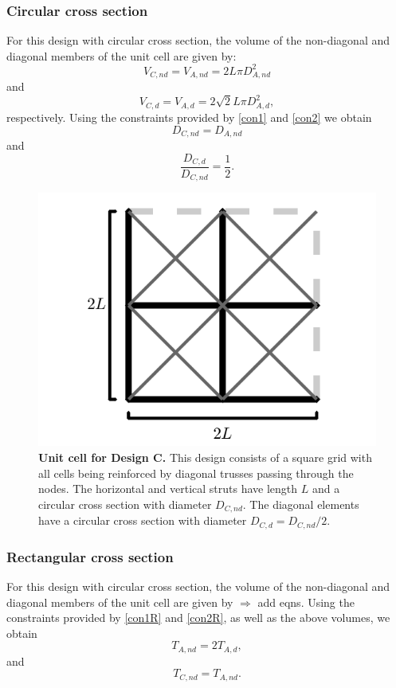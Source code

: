 \documentclass[10pt,twoside]{fernandes_supp}
\newcommand{\KB}[1]{\noindent\color{blue}$\Longrightarrow$ #1\normalcolor}
\begin{document}
\subsubsection{Circular cross section}
For this design with circular cross section, the volume of the non-diagonal and diagonal members  of the unit cell are given by:
\begin{equation}
V_{C,nd}=V_{A,nd}=2 L \pi D^2_{A,nd}
\end{equation}
and
\begin{equation}
V_{C,d}=V_{A,d}=2\sqrt{2}L \pi D^2_{A,d},
\end{equation}
respectively.
Using the constraints provided by \cref{con1} and \cref{con2} we  obtain 
\begin{equation}
{{D}_{C,nd}}={{D}_{A,nd}}
\end{equation}
and
\begin{equation}
\frac{{D}_{C,d}}{{D}_{C,nd}}=\frac{1}{2}.
\end{equation}

\begin{figure}[H]
    \centering
    \includegraphics[width=0.4\linewidth]{SFig4.png}
    \caption{{\bf Unit cell for Design C.} This design consists of a square grid with all cells being reinforced by diagonal trusses passing through the nodes.  The horizontal and vertical struts have length $L$ and a circular cross section with diameter $D_{C,nd}$. The diagonal elements have a circular cross section  with diameter $D_{C,d}={D_{C,nd}}/{2}$.}
    \label{DesignC}
\end{figure}

\subsubsection{Rectangular cross section}
For this design with circular cross section, the volume of the non-diagonal and diagonal members  of the unit cell are given by
\KB{add eqns.}
Using the constraints provided by \cref{con1R} and \cref{con2R}, as well as the above volumes, we  obtain
\begin{equation}
T_{A,nd}=2T_{A,d},
\end{equation}
and
\begin{equation}
T_{C,nd}=T_{A,nd}.
\end{equation}
\end{document}
